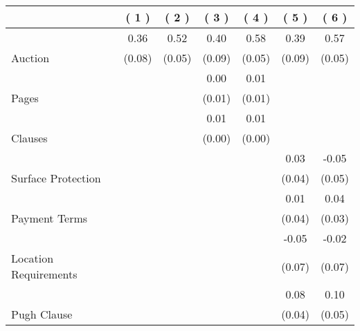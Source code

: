 
\begin{tabular}{lcccccc}
\toprule
 & ( 1 ) & ( 2 ) & ( 3 ) & ( 4 ) & ( 5 ) & ( 6 )\\
\midrule
 & 0.36 & 0.52 & 0.40 & 0.58 & 0.39 & 0.57\\

\multirow{-2}{*}{\raggedright\arraybackslash Auction} & (0.08) & (0.05) & (0.09) & (0.05) & (0.09) & (0.05)\\

 & \phantom{X} & \phantom{X} & 0.00 & 0.01 & \phantom{X} & \phantom{X}\\

\multirow{-2}{*}{\raggedright\arraybackslash Pages} & \phantom{X} & \phantom{X} & (0.01) & (0.01) & \phantom{X} & \phantom{X}\\

 & \phantom{X} & \phantom{X} & 0.01 & 0.01 & \phantom{X} & \phantom{X}\\

\multirow{-2}{*}{\raggedright\arraybackslash Clauses} & \phantom{X} & \phantom{X} & (0.00) & (0.00) & \phantom{X} & \phantom{X}\\

 & \phantom{X} & \phantom{X} & \phantom{X} & \phantom{X} & 0.03 & -0.05\\

\multirow{-2}{*}{\raggedright\arraybackslash Surface Protection} & \phantom{X} & \phantom{X} & \phantom{X} & \phantom{X} & (0.04) & (0.05)\\

 & \phantom{X} & \phantom{X} & \phantom{X} & \phantom{X} & 0.01 & 0.04\\

\multirow{-2}{*}{\raggedright\arraybackslash Payment Terms} & \phantom{X} & \phantom{X} & \phantom{X} & \phantom{X} & (0.04) & (0.03)\\

 & \phantom{X} & \phantom{X} & \phantom{X} & \phantom{X} & -0.05 & -0.02\\

\multirow{-2}{*}{\raggedright\arraybackslash Location Requirements} & \phantom{X} & \phantom{X} & \phantom{X} & \phantom{X} & (0.07) & (0.07)\\

 & \phantom{X} & \phantom{X} & \phantom{X} & \phantom{X} & 0.08 & 0.10\\

\multirow{-2}{*}{\raggedright\arraybackslash Pugh Clause} & \phantom{X} & \phantom{X} & \phantom{X} & \phantom{X} & (0.04) & (0.05)\\


\end{tabular}
